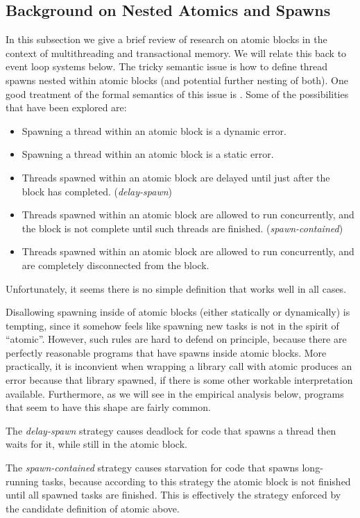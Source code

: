 \documentclass[acmsmall,anonymous,review]{acmart}\settopmatter{printfolios=true,printccs=false,printacmref=false}
\begin{document}
\subsection{Background on Nested Atomics and Spawns}

In this subsection we give a brief review of research on atomic blocks in the context of multithreading and transactional memory.
We will relate this back to event loop systems below.
The tricky semantic issue is how to define thread spawns nested within atomic blocks (and potential further nesting of both).
One good treatment of the formal semantics of this issue is \cite{Moore2008}.
Some of the possibilities that have been explored are:
\begin{itemize}
\item Spawning a thread within an atomic block is a dynamic error.
\item Spawning a thread within an atomic block is a static error.
\item Threads spawned within an atomic block are delayed until just after the block has completed. (\emph{delay-spawn})
\item Threads spawned within an atomic block are allowed to run concurrently, and the block is not complete until such threads are finished. (\emph{spawn-contained})
\item Threads spawned within an atomic block are allowed to run concurrently, and are completely disconnected from the block.
\end{itemize}

Unfortunately, it seems there is no simple definition that works well in all cases.

Disallowing spawning inside of atomic blocks (either statically or dynamically) is tempting, since it somehow feels like spawning new tasks is not in the spirit of ``atomic''.
However, such rules are hard to defend on principle, because there are perfectly reasonable programs that have spawns inside atomic blocks.
More practically, it is inconvient when wrapping a library call with atomic produces an error because that library spawned, if there is some other workable interpretation available.
Furthermore, as we will see in the empirical analysis below, programs that seem to have this shape are fairly common.

The \emph{delay-spawn} strategy causes deadlock for code that spawns a thread then waits for it, while still in the atomic block.

The \emph{spawn-contained} strategy causes starvation for code that spawns long-running tasks, because according to this strategy the atomic block is not finished until all spawned tasks are finished.
This is effectively the strategy enforced by the candidate definition of atomic above.
\end{document}
